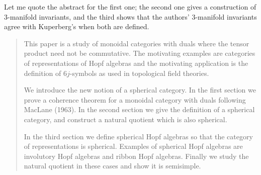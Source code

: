 \documentclass{article}
\def\tightlist{}
\renewcommand{\texttt}[1]{%
  \begingroup
  \ttfamily
  \begingroup\lccode`~=`/\lowercase{\endgroup\def~}{/\discretionary{}{}{}}%
  \begingroup\lccode`~=`[\lowercase{\endgroup\def~}{[\discretionary{}{}{}}%
  \begingroup\lccode`~=`.\lowercase{\endgroup\def~}{.\discretionary{}{}{}}%
  \catcode`/=\active\catcode`[=\active\catcode`.=\active
  \scantokens{#1\noexpand}%
  \endgroup
}
\begin{document}

Let me quote the abstract for the first one; the second one gives a
construction of 3-manifold invariants, and the third shows that the
authors' 3-manifold invariants agree with Kuperberg's when both are
defined.

\begin{quote}
This paper is a study of monoidal categories with duals where the tensor
product need not be commutative. The motivating examples are categories
of representations of Hopf algebras and the motivating application is
the definition of \(6j\)-symbols as used in topological field theories.

We introduce the new notion of a spherical category. In the first
section we prove a coherence theorem for a monoidal category with duals
following MacLane (1963). In the second section we give the definition
of a spherical category, and construct a natural quotient which is also
spherical.

In the third section we define spherical Hopf algebras so that the
category of representations is spherical. Examples of spherical Hopf
algebras are involutory Hopf algebras and ribbon Hopf algebras. Finally
we study the natural quotient in these cases and show it is semisimple.
\end{quote}

\end{document}
